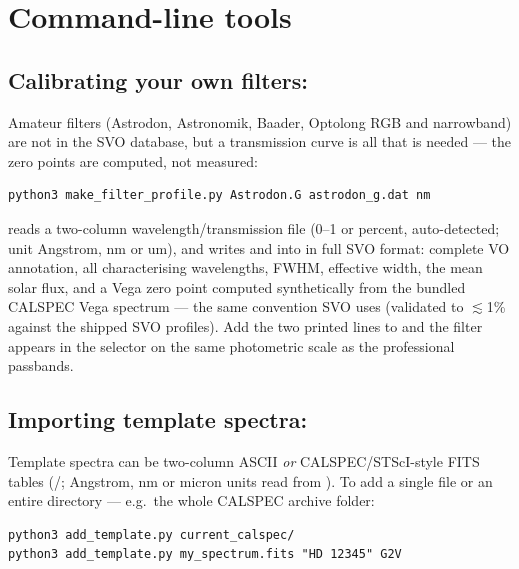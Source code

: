 \section{Command-line tools}

\subsection{Calibrating your own filters: }
\label{sec:tool-filter}

Amateur filters (Astrodon, Astronomik, Baader, Optolong RGB and
narrowband) are not in the SVO database, but a transmission curve is all
that is needed --- the zero points are computed, not measured:

\begin{verbatim}
python3 make_filter_profile.py Astrodon.G astrodon_g.dat nm
\end{verbatim}

reads a two-column wavelength/transmission file (0--1 or percent,
auto-detected; unit Angstrom, nm or um), and writes
 and  into
 in full SVO format: complete VO annotation, all
characterising wavelengths, FWHM, effective width, the mean solar flux,
and a Vega zero point computed synthetically from the bundled CALSPEC Vega
spectrum --- the same convention SVO uses (validated to $\lesssim$1\%
against the shipped SVO profiles). Add the two printed lines to
 and the filter appears in the selector on the
same photometric scale as the professional passbands.

\subsection{Importing template spectra: }
\label{sec:tool-template}

Template spectra can be two-column ASCII \emph{or} CALSPEC/STScI-style
FITS tables (/; Angstrom, nm or micron units
read from ). To add a single file or an entire directory ---
e.g.\ the whole CALSPEC archive folder:

\begin{verbatim}
python3 add_template.py current_calspec/
python3 add_template.py my_spectrum.fits "HD 12345" G2V
\end{verbatim}

